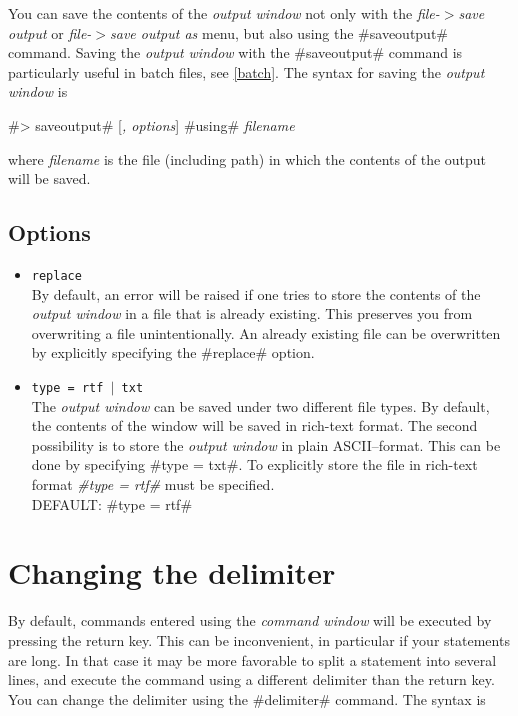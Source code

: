 You can save the contents of the {\em output window} not only with
the {\em file-$>$save output} or {\em file-$>$save output as}
menu, but also using the #saveoutput# command. Saving the {\em
output window} with the #saveoutput# command is  particularly
useful in batch files, see \autoref{batch}. The syntax for saving
the
{\em output window} is

#> saveoutput# [{\em , options}] #using# {\em filename}

where {\em filename} is the file (including path) in which the
contents of the output will be saved.


\subsection*{Options}

\begin{itemize}
\item {\tt replace} \\
By default, an error will be raised if one tries to store the
contents of the {\em output window} in a file that is already
existing. This preserves you from overwriting a file
unintentionally. An already existing file can be overwritten by
explicitly specifying the #replace# option.
\item {\tt type = rtf $|$ txt } \\
The {\em output window} can be saved under two different file
types. By default, the contents of the window will be saved in
rich-text format. The second possibility is to store the {\em
output window} in plain ASCII--format. This can be done by
specifying #type = txt#. To explicitly store the file in rich-text
format {\em #type = rtf#} must be specified. \\
DEFAULT: #type = rtf#
\end{itemize}

\section{Changing the delimiter}
\label{delimiter} 

By default, commands entered using the {\em command window} will
be executed by pressing the return key. This can be inconvenient,
in particular if your statements are long. In that case it may be
more favorable to split a statement into several lines, and
execute the command using a different delimiter than the return
key. You can change the delimiter using the #delimiter# command. The syntax is

